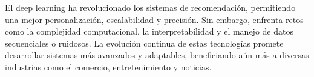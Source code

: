 El deep learning ha revolucionado los sistemas de recomendación, permitiendo una mejor personalización, escalabilidad y precisión. Sin embargo, enfrenta retos como la complejidad computacional, la interpretabilidad y el manejo de datos secuenciales o ruidosos. La evolución continua de estas tecnologías promete desarrollar sistemas más avanzados y adaptables, beneficiando aún más a diversas industrias como el comercio, entretenimiento y noticias.




